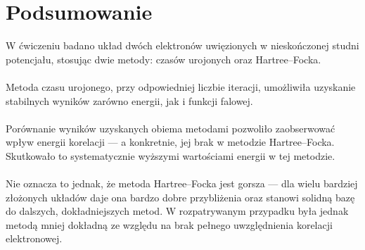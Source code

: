 \documentclass{article}
\begin{document}
\section{Podsumowanie}
W ćwiczeniu badano układ dwóch elektronów uwięzionych w nieskończonej studni potencjału, stosując dwie metody: czasów urojonych oraz Hartree--Focka.\\
\\
Metoda czasu urojonego, przy odpowiedniej liczbie iteracji, umożliwiła uzyskanie stabilnych wyników zarówno energii, jak i funkcji falowej.\\
\\
Porównanie wyników uzyskanych obiema metodami pozwoliło zaobserwować wpływ energii korelacji — a konkretnie, jej brak w metodzie Hartree--Focka. 
Skutkowało to systematycznie wyższymi wartościami energii w tej metodzie.\\
\\
Nie oznacza to jednak, że metoda Hartree--Focka jest gorsza — dla wielu bardziej złożonych układów daje ona bardzo dobre przybliżenia oraz stanowi solidną bazę do dalszych, dokładniejszych metod. 
W rozpatrywanym przypadku była jednak metodą mniej dokładną ze względu na brak pełnego uwzględnienia korelacji elektronowej.
\end{document}
